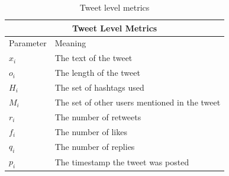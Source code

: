 \documentclass[NETN,manuscript]{stjour-new}
\begin{document}
\begin{table}[h!]
\centering
\begin{tabular}{ |p{3cm}|p{9cm}|  }
\hline
\multicolumn{2}{|c|}{Tweet Level Metrics} \\
\hline
Parameter & Meaning \\
\hline
$x_i$ & The text of the tweet \\
$o_i$ & The length of the tweet \\
$H_i$ & The set of hashtags used\\
$M_i$ & The set of other users mentioned in the tweet\\
$r_i$ & The number of retweets \\
$f_i$ & The number of likes \\
$q_i$ & The number of replies\\
$p_i$ & The timestamp the tweet was posted \\
\hline
\end{tabular}
\caption{Tweet level metrics}
\label{users}
\end{table}
\end{document}
